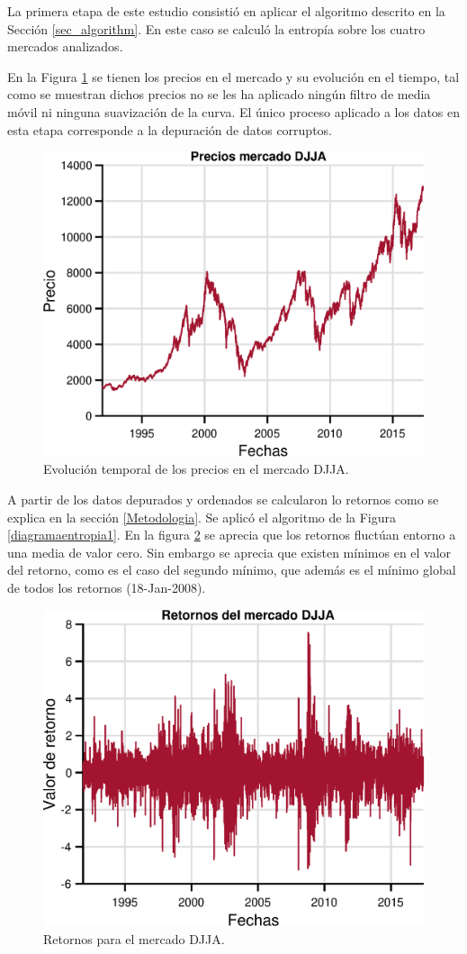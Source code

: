 {
La primera etapa de este estudio consistió en aplicar el algoritmo descrito en la Sección \ref{sec_algorithm}.
En este caso se calculó la entropía sobre los cuatro mercados analizados. 

En la Figura \ref{precioseps} se tienen los precios en el mercado y su evolución en el tiempo, tal como se muestran dichos precios no se les ha aplicado ningún filtro de media móvil ni ninguna suavización de la curva.
El único proceso aplicado a los datos en esta etapa corresponde a la depuración de datos corruptos.

\begin{figure}[h!]
	\centering
	\includegraphics[width=0.7\linewidth]{figures/precioseps}
	\caption{Evolución temporal de los precios en el mercado DJJA.}
	\label{precioseps}
\end{figure}

A partir de los datos depurados y ordenados se calcularon lo retornos como se explica en la sección \ref{Metodologia}. Se aplicó el algoritmo de la Figura \ref{diagramaentropia1}. 
En la figura \ref{onlyreturnseps} se aprecia que los retornos fluctúan entorno a una media de valor cero. 
Sin embargo se aprecia que existen mínimos en el valor del retorno, como es el caso del segundo mínimo, que además es el mínimo global de todos los retornos (18-Jan-2008).

\begin{figure}[h!]
	\centering
	\includegraphics[width=0.7\linewidth]{figures/onlyreturnseps}
	\caption{Retornos para el mercado DJJA.}
	\label{onlyreturnseps}
\end{figure}

}

